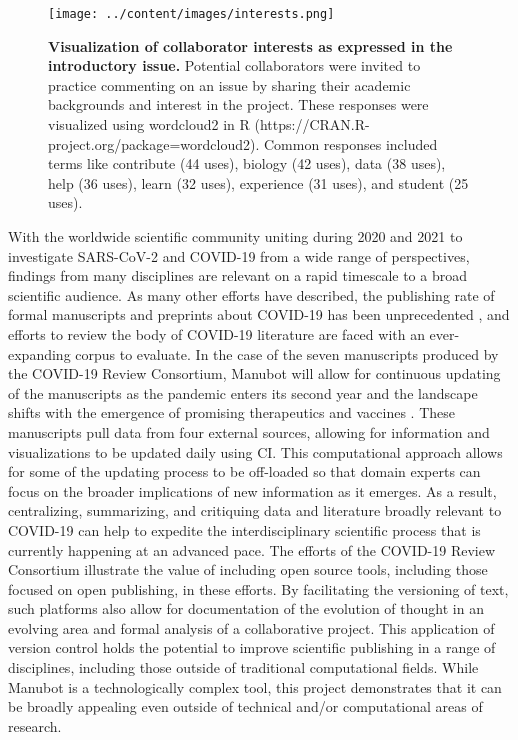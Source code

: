 \documentclass[sigconf]{acmart}
\begin{document}
\begin{figure}
\hypertarget{fig:wordcloud}{%
\centering
\texttt{[image: ../content/images/interests.png]}
\caption{\textbf{Visualization of collaborator interests as expressed in the introductory issue.}
Potential collaborators were invited to practice commenting on an issue by sharing their academic backgrounds and interest in the project.
These responses were visualized using wordcloud2 in R (https://CRAN.R-project.org/package=wordcloud2).
Common responses included terms like contribute (44 uses), biology (42 uses), data (38 uses), help (36 uses), learn (32 uses), experience (31 uses), and student (25 uses).}\label{fig:wordcloud}
}
\end{figure}

With the worldwide scientific community uniting during 2020 and 2021 to investigate SARS-CoV-2 and COVID-19 from a wide range of perspectives, findings from many disciplines are relevant on a rapid timescale to a broad scientific audience.
As many other efforts have described, the publishing rate of formal manuscripts and preprints about COVID-19 has been unprecedented \citep{7ub6VM4Z}, and efforts to review the body of COVID-19 literature are faced with an ever-expanding corpus to evaluate.
In the case of the seven manuscripts produced by the COVID-19 Review Consortium, Manubot will allow for continuous updating of the manuscripts as the pandemic enters its second year and the landscape shifts with the emergence of promising therapeutics and vaccines \citep{cifK9B8t, i2CGFwI3}.
These manuscripts pull data from four external sources, allowing for information and visualizations to be updated daily using CI.
This computational approach allows for some of the updating process to be off-loaded so that domain experts can focus on the broader implications of new information as it emerges.
As a result, centralizing, summarizing, and critiquing data and literature broadly relevant to COVID-19 can help to expedite the interdisciplinary scientific process that is currently happening at an advanced pace.
The efforts of the COVID-19 Review Consortium illustrate the value of including open source tools, including those focused on open publishing, in these efforts.
By facilitating the versioning of text, such platforms also allow for documentation of the evolution of thought in an evolving area and formal analysis of a collaborative project.
This application of version control holds the potential to improve scientific publishing in a range of disciplines, including those outside of traditional computational fields.
While Manubot is a technologically complex tool, this project demonstrates that it can be broadly appealing even outside of technical and/or computational areas of research.
\end{document}
